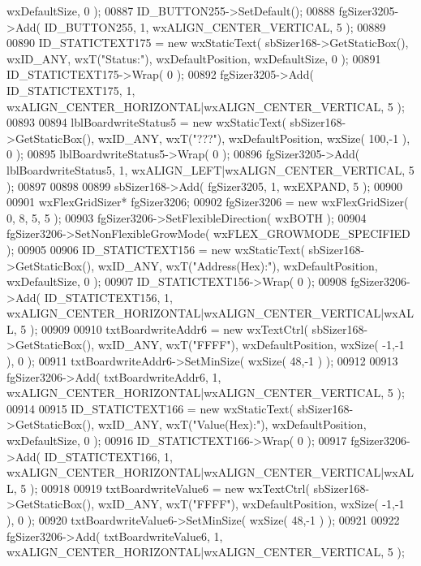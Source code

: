 \begin{DoxyCode}
      wxDefaultSize, 0 );
00887     ID_BUTTON255->SetDefault(); 
00888     fgSizer3205->Add( ID_BUTTON255, 1, wxALIGN\_CENTER\_VERTICAL, 5 );
00889     
00890     ID_STATICTEXT175 = \textcolor{keyword}{new} wxStaticText( sbSizer168->GetStaticBox(), wxID\_ANY, wxT(\textcolor{stringliteral}{"Status:"}), 
      wxDefaultPosition, wxDefaultSize, 0 );
00891     ID_STATICTEXT175->Wrap( 0 );
00892     fgSizer3205->Add( ID_STATICTEXT175, 1, wxALIGN\_CENTER\_HORIZONTAL|wxALIGN\_CENTER\_VERTICAL, 5 );
00893     
00894     lblBoardwriteStatus5 = \textcolor{keyword}{new} wxStaticText( sbSizer168->GetStaticBox(), wxID\_ANY, wxT(\textcolor{stringliteral}{"???"}), 
      wxDefaultPosition, wxSize( 100,-1 ), 0 );
00895     lblBoardwriteStatus5->Wrap( 0 );
00896     fgSizer3205->Add( lblBoardwriteStatus5, 1, wxALIGN\_LEFT|wxALIGN\_CENTER\_VERTICAL, 5 );
00897     
00898     
00899     sbSizer168->Add( fgSizer3205, 1, wxEXPAND, 5 );
00900     
00901     wxFlexGridSizer* fgSizer3206;
00902     fgSizer3206 = \textcolor{keyword}{new} wxFlexGridSizer( 0, 8, 5, 5 );
00903     fgSizer3206->SetFlexibleDirection( wxBOTH );
00904     fgSizer3206->SetNonFlexibleGrowMode( wxFLEX\_GROWMODE\_SPECIFIED );
00905     
00906     ID_STATICTEXT156 = \textcolor{keyword}{new} wxStaticText( sbSizer168->GetStaticBox(), wxID\_ANY, wxT(\textcolor{stringliteral}{"Address(Hex):"}), 
      wxDefaultPosition, wxDefaultSize, 0 );
00907     ID_STATICTEXT156->Wrap( 0 );
00908     fgSizer3206->Add( ID_STATICTEXT156, 1, wxALIGN\_CENTER\_HORIZONTAL|wxALIGN\_CENTER\_VERTICAL|wxALL, 5 );
00909     
00910     txtBoardwriteAddr6 = \textcolor{keyword}{new} wxTextCtrl( sbSizer168->GetStaticBox(), wxID\_ANY, wxT(\textcolor{stringliteral}{"FFFF"}), 
      wxDefaultPosition, wxSize( -1,-1 ), 0 );
00911     txtBoardwriteAddr6->SetMinSize( wxSize( 48,-1 ) );
00912     
00913     fgSizer3206->Add( txtBoardwriteAddr6, 1, wxALIGN\_CENTER\_HORIZONTAL|wxALIGN\_CENTER\_VERTICAL, 5 );
00914     
00915     ID_STATICTEXT166 = \textcolor{keyword}{new} wxStaticText( sbSizer168->GetStaticBox(), wxID\_ANY, wxT(\textcolor{stringliteral}{"Value(Hex):"}), 
      wxDefaultPosition, wxDefaultSize, 0 );
00916     ID_STATICTEXT166->Wrap( 0 );
00917     fgSizer3206->Add( ID_STATICTEXT166, 1, wxALIGN\_CENTER\_HORIZONTAL|wxALIGN\_CENTER\_VERTICAL|wxALL, 5 );
00918     
00919     txtBoardwriteValue6 = \textcolor{keyword}{new} wxTextCtrl( sbSizer168->GetStaticBox(), wxID\_ANY, wxT(\textcolor{stringliteral}{"FFFF"}), 
      wxDefaultPosition, wxSize( -1,-1 ), 0 );
00920     txtBoardwriteValue6->SetMinSize( wxSize( 48,-1 ) );
00921     
00922     fgSizer3206->Add( txtBoardwriteValue6, 1, wxALIGN\_CENTER\_HORIZONTAL|wxALIGN\_CENTER\_VERTICAL, 5 );

\end{DoxyCode}
